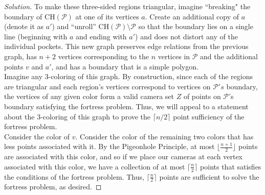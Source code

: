 \documentclass[11pt]{article}
\newcommand{\CH}{\mathrm{CH}}
\newenvironment{solution}
  {\renewcommand\qedsymbol{$\blacksquare$}\begin{proof}[Solution]}
  {\end{proof}}
\begin{document}
\begin{enumerate}
\begin{solution}
To make these three-sided regions triangular, imagine ``breaking" the boundary of $\CH(\mathcal{P})$ at one of its vertices $a$. Create an additional copy of $a$ (denote it as $a'$) and ``unroll'' $\CH(\mathcal{P})\setminus\mathcal{P}$ so that the boundary lies on a single line (beginning with $a$ and ending with $a'$) and does not distort any of the individual pockets. This new graph preserves edge relations from the previous graph, has $n+2$ vertices corresponding to the $n$ vertices in $\mathcal{P}$ and the additional points $v$ and $a'$, and has a boundary that is a simple polygon. \\

Imagine any $3$-coloring of this graph. By construction, since each of the regions are triangular and each region's vertices correspond to vertices on $\mathcal{P}'s$ boundary, the vertices of any given color form a valid camera set $Z$ of points on $\mathcal{P}$'s boundary satisfying the fortress problem. Thus, we will appeal to a statement about the $3$-coloring of this graph to prove the $\lceil n/2\rceil$ point sufficiency of the fortress problem. \\

Consider the color of $v$. Consider the color of the remaining two colors that has less points associated with it. By the Pigeonhole Principle, at most $\lfloor \frac{n+1}{2} \rfloor$ points are associated with this color, and so if we place our cameras at each vertex associated with this color, we have a collection of at most $\lceil \frac{n}{2} \rceil$ points that satisfies the conditions of the fortress problem. Thus, $\lceil \frac{n}{2} \rceil$ points are sufficient to solve the fortress problem, as desired. 
\end{solution}

\end{enumerate}
\end{document}
